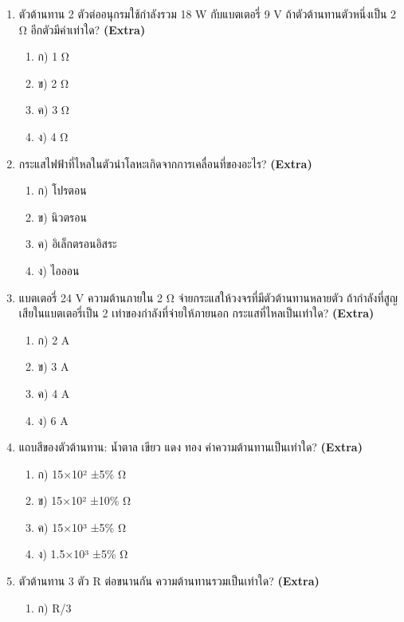 \documentclass[12pt]{article}
\begin{document}
\begin{enumerate}[label=\arabic*.]
\begin{enumerate}[label=)]
\item ก) 2.55 A
\item ข) 3.39 A
\item ค) 4.24 A
\item ง) 5.09 A
\end{enumerate}
\item ตัวต้านทาน 2 ตัวต่ออนุกรมใช้กำลังรวม 18 W กับแบตเตอรี่ 9 V ถ้าตัวต้านทานตัวหนึ่งเป็น 2 Ω อีกตัวมีค่าเท่าใด? \hfill \textbf{\small (Extra)}
\begin{enumerate}[label=)]
\item ก) 1 Ω
\item ข) 2 Ω
\item ค) 3 Ω
\item ง) 4 Ω
\end{enumerate}
\item กระแสไฟฟ้าที่ไหลในตัวนำโลหะเกิดจากการเคลื่อนที่ของอะไร? \hfill \textbf{\small (Extra)}
\begin{enumerate}[label=)]
\item ก) โปรตอน
\item ข) นิวตรอน
\item ค) อิเล็กตรอนอิสระ
\item ง) ไอออน
\end{enumerate}
\item แบตเตอรี่ 24 V ความต้านภายใน 2 Ω จ่ายกระแสให้วงจรที่มีตัวต้านทานหลายตัว ถ้ากำลังที่สูญเสียในแบตเตอรี่เป็น 2 เท่าของกำลังที่จ่ายให้ภายนอก กระแสที่ไหลเป็นเท่าใด? \hfill \textbf{\small (Extra)}
\begin{enumerate}[label=)]
\item ก) 2 A
\item ข) 3 A
\item ค) 4 A
\item ง) 6 A
\end{enumerate}
\item แถบสีของตัวต้านทาน: น้ำตาล เขียว แดง ทอง ค่าความต้านทานเป็นเท่าใด? \hfill \textbf{\small (Extra)}
\begin{enumerate}[label=)]
\item ก) 15×10² ±5\% Ω
\item ข) 15×10² ±10\% Ω
\item ค) 15×10³ ±5\% Ω
\item ง) 1.5×10³ ±5\% Ω
\end{enumerate}
\item ตัวต้านทาน 3 ตัว R ต่อขนานกัน ความต้านทานรวมเป็นเท่าใด? \hfill \textbf{\small (Extra)}
\begin{enumerate}[label=)]
\item ก) R/3

\end{enumerate}
\end{enumerate}
\end{document}
